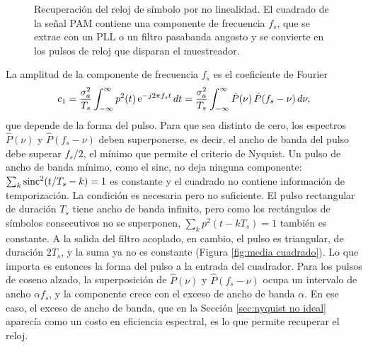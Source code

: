 \begin{figure}
    \begin{center}
    \end{center}
    \caption{Recuperación del reloj de símbolo por no linealidad. El cuadrado de la señal PAM contiene una componente de frecuencia $f_s$, que se extrae con un PLL o un filtro pasabanda angosto y se convierte en los pulsos de reloj que disparan el muestreador.}\label{fig:reloj cuadratico}
\end{figure}

La amplitud de la componente de frecuencia $f_s$ es el coeficiente de Fourier
\begin{equation*}
    c_1 = \frac{\sigma_a^2}{T_s}\int_{-\infty}^{\infty}p^2(t)\,\mathrm{e}^{-j2\pi f_st}\,dt = \frac{\sigma_a^2}{T_s}\int_{-\infty}^{\infty}\hat P(\nu)\,\hat P(f_s-\nu)\,d\nu,
\end{equation*}
que depende de la forma del pulso. Para que sea distinto de cero, los espectros $\hat P(\nu)$ y $\hat P(f_s-\nu)$ deben superponerse, es decir, el ancho de banda del pulso debe superar $f_s/2$, el mínimo que permite el criterio de Nyquist. Un pulso de ancho de banda mínimo, como el sinc, no deja ninguna componente: $\sum_k\operatorname{sinc}^2(t/T_s-k)=1$ es constante y el cuadrado no contiene información de temporización. La condición es necesaria pero no suficiente. El pulso rectangular de duración $T_s$ tiene ancho de banda infinito, pero como los rectángulos de símbolos consecutivos no se superponen, $\sum_k p^2(t-kT_s)=1$ también es constante. A la salida del filtro acoplado, en cambio, el pulso es triangular, de duración $2T_s$, y la suma ya no es constante (Figura \ref{fig:media cuadrado}). Lo que importa es entonces la forma del pulso a la entrada del cuadrador. Para los pulsos de coseno alzado, la superposición de $\hat P(\nu)$ y $\hat P(f_s-\nu)$ ocupa un intervalo de ancho $\alpha f_s$, y la componente crece con el exceso de ancho de banda $\alpha$. En ese caso, el exceso de ancho de banda, que en la Sección \ref{sec:nyquist no ideal} aparecía como un costo en eficiencia espectral, es lo que permite recuperar el reloj.

